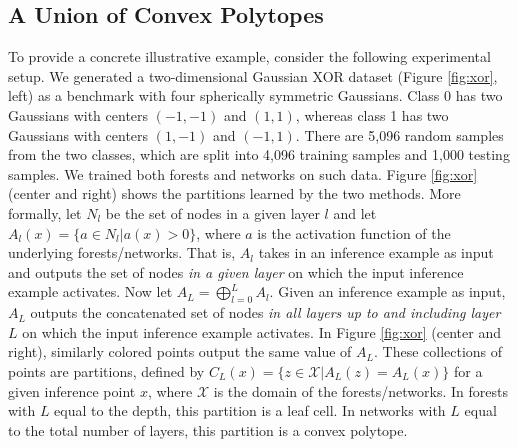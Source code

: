 \subsection{A Union of Convex Polytopes}
To provide a concrete illustrative example, consider the following experimental setup. We generated a two-dimensional Gaussian XOR dataset (Figure \ref{fig:xor}, left) as a benchmark with four spherically symmetric Gaussians. Class 0 has two Gaussians with centers $(-1,-1)$ and $(1,1)$, whereas class 1 has two Gaussians with centers $(1,-1)$ and $(-1,1)$. There are 5,096 random samples from the two classes, which are split into 4,096 training samples and 1,000 testing samples. We trained both forests and networks on such data. Figure \ref{fig:xor} (center and right) shows the partitions learned by the two methods. More formally, let $N_l$ be the set of nodes in a given layer $l$ and let $A_l(x) = \{a \in N_l | a(x) > 0\}$, where $a$ is the activation function of the underlying forests/networks. That is, $A_l$ takes in an inference example as input and outputs the set of nodes \textit{in a given layer} on which the input inference example activates. Now let $A_L = \bigoplus_{l = 0}^L A_l$.
Given an inference example as input, $A_L$ outputs the concatenated set of nodes \textit{in all layers up to and including layer $L$} on which the input inference example activates. 
In Figure \ref{fig:xor} (center and right), similarly colored points output the same value of $A_L$. 
These collections of points are partitions, defined by $C_L(x) = \{z \in \mathcal{X} | A_L(z) = A_L(x)\}$ for a given inference point $x$, where $\mathcal{X}$ is the domain of the forests/networks.
In forests with $L$ equal to the depth, this partition is a leaf cell. In networks with $L$ equal to the total number of layers, this partition is a convex polytope.

